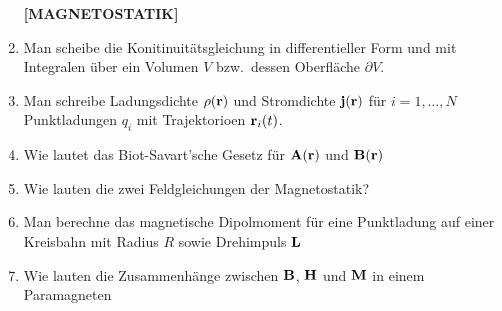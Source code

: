 \documentclass{scrartcl}
\begin{document}
\begin{enumerate}
    \textbf{[MAGNETOSTATIK]}\\
    \item Man scheibe die Konitinuitätsgleichung in differentieller Form
          und mit Integralen über ein Volumen $V$ bzw.\ dessen Oberfläche 
          $\partial V$.\\

    \item Man schreibe Ladungsdichte $\rho(\vb r)$ und Stromdichte
          $\vb j(\vb r)$ für $i=1,\ldots,N$ Punktladungen $q_i$ mit 
          Trajektorioen $\vb r_i(t)$.\\

    \item Wie lautet das Biot-Savart'sche Gesetz für $\vb A(\vb r)$ und
          $\vb B(\vb r)$\\

    \item Wie lauten die zwei Feldgleichungen der Magnetostatik?\\

    \item Man berechne das magnetische Dipolmoment für eine Punktladung auf
          einer Kreisbahn mit Radius $R$ sowie Drehimpuls $\vb L$\\

    \item Wie lauten die Zusammenhänge zwischen $\vb B$, $\vb H$ 
          und $\vb M$ in einem
          Paramagneten\\

  \end{enumerate}

  \newpage
\end{document}
